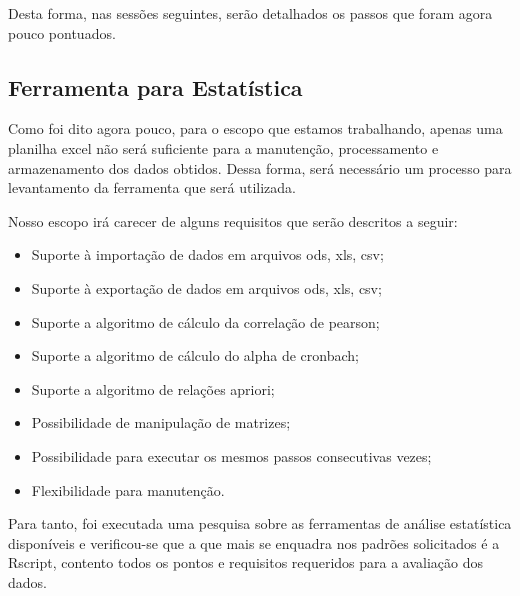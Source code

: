 Desta forma, nas sessões seguintes, serão detalhados os passos que foram agora pouco pontuados.

\subsection{Ferramenta para Estatística}
\label{sub:ferramenta_para_estat_stica}
Como foi dito agora pouco, para o escopo que estamos trabalhando, apenas uma planilha excel não será suficiente
para a manutenção, processamento e armazenamento dos dados obtidos. Dessa forma, será  necessário um processo
para levantamento da ferramenta que será utilizada.

Nosso escopo irá carecer de alguns requisitos que serão descritos a seguir:

\begin{itemize}
    \item Suporte à importação de dados em arquivos ods, xls, csv;
    \item Suporte à exportação de dados em arquivos ods, xls, csv;
    \item Suporte a algoritmo de cálculo da correlação de pearson;
    \item Suporte a algoritmo de cálculo do alpha de cronbach;
    \item Suporte a algoritmo de relações apriori;
    \item Possibilidade de manipulação de matrizes;
    \item Possibilidade para executar os mesmos passos consecutivas vezes;
    \item Flexibilidade para manutenção.
\end{itemize}

Para tanto, foi executada uma pesquisa sobre as ferramentas de análise estatística
disponíveis e verificou-se que a que mais se enquadra nos padrões solicitados
é a Rscript, contento todos os pontos e requisitos requeridos para a
avaliação dos dados.

